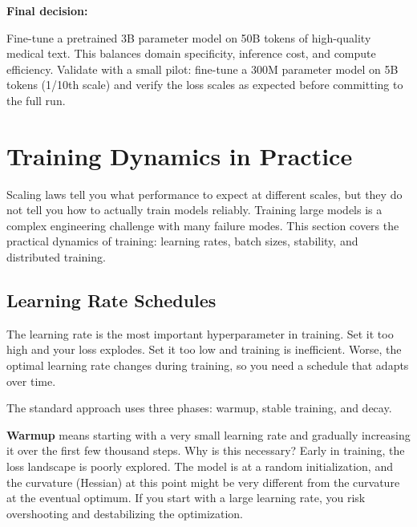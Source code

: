 \begin{examplebox}
\vspace{0.5em}

\textbf{Final decision:}

Fine-tune a pretrained 3B parameter model on 50B tokens of high-quality medical text. This balances domain specificity, inference cost, and compute efficiency. Validate with a small pilot: fine-tune a 300M parameter model on 5B tokens (1/10th scale) and verify the loss scales as expected before committing to the full run.
\end{examplebox}

\vspace{1.5em}

\vspace{2em}

\section{Training Dynamics in Practice}

Scaling laws tell you what performance to expect at different scales, but they do not tell you how to actually train models reliably. Training large models is a complex engineering challenge with many failure modes. This section covers the practical dynamics of training: learning rates, batch sizes, stability, and distributed training.

\vspace{1em}

\subsection{Learning Rate Schedules}

The learning rate is the most important hyperparameter in training. Set it too high and your loss explodes. Set it too low and training is inefficient. Worse, the optimal learning rate changes during training, so you need a schedule that adapts over time.

The standard approach uses three phases: warmup, stable training, and decay.

\textbf{Warmup} means starting with a very small learning rate and gradually increasing it over the first few thousand steps. Why is this necessary? Early in training, the loss landscape is poorly explored. The model is at a random initialization, and the curvature (Hessian) at this point might be very different from the curvature at the eventual optimum. If you start with a large learning rate, you risk overshooting and destabilizing the optimization.

